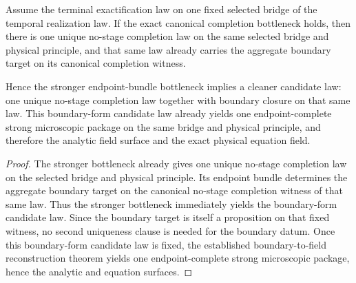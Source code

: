 \begin{theorem}
\label{thm:canonical-boundary-microscopic-law-target}
Assume the terminal exactification law on one fixed selected bridge of the
temporal realization law. If the exact canonical completion bottleneck holds,
then there is one unique no-stage completion law on the same selected bridge
and physical principle, and that same law
already carries the aggregate boundary target on its canonical
completion witness.

Hence the stronger endpoint-bundle bottleneck implies a cleaner candidate law:
one unique no-stage completion law together with boundary closure on that same
law. This boundary-form candidate law already yields one endpoint-complete
strong microscopic package on the same bridge and physical principle, and
therefore the analytic field surface and the exact physical equation field.
\end{theorem}

\begin{proof}
The stronger bottleneck already gives one unique no-stage completion law on the
selected bridge and physical principle. Its endpoint bundle determines the
aggregate boundary target on the canonical no-stage completion witness of that
same law. Thus the stronger bottleneck immediately yields the boundary-form
candidate law. Since the boundary target is itself a proposition on that fixed
witness, no second uniqueness clause is needed for the boundary datum. Once
this boundary-form candidate law is fixed, the established boundary-to-field
reconstruction theorem yields one endpoint-complete strong microscopic package,
hence the analytic and equation surfaces.
\end{proof}

